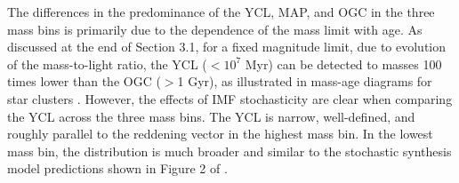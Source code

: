 \documentclass[linenumbers]{aastex63}
\begin{document}
The differences in the predominance of the YCL, MAP, and OGC in the three mass bins is primarily due to the dependence of the mass limit with age. As discussed at the end of Section 3.1, for a fixed magnitude limit, due to evolution of the mass-to-light ratio, the YCL ($<10^7$ Myr) can be detected to masses 100 times lower than the OGC ($>$1 Gyr), as illustrated in mass-age diagrams for star clusters \citep[e.g.,][]{cook_star_2019}.
However, the effects of IMF stochasticity are clear when comparing the YCL across the three mass bins.  The YCL is narrow, well-defined, and roughly parallel to the reddening vector in the highest mass bin.  In the lowest mass bin, the distribution is much broader and similar to the stochastic synthesis model predictions shown in Figure 2 of \citet{fouesneau_analyzing_2012}.
\end{document}
